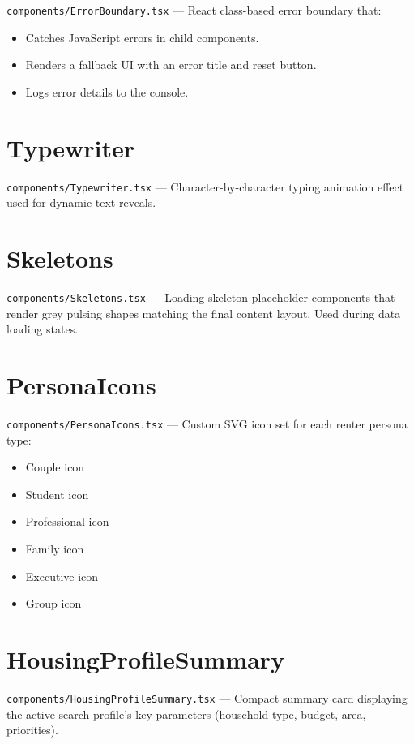\documentclass[12pt, a4paper, oneside]{report}
\newcommand{\filepath}[1]{\texttt{\small\color{codeblue}#1}}
\begin{document}
\filepath{components/ErrorBoundary.tsx} --- React class-based error boundary that:
\begin{itemize}[leftmargin=2em]
  \item Catches JavaScript errors in child components.
  \item Renders a fallback UI with an error title and reset button.
  \item Logs error details to the console.
\end{itemize}

\section{Typewriter}

\filepath{components/Typewriter.tsx} --- Character-by-character typing animation effect used for dynamic text reveals.

\section{Skeletons}

\filepath{components/Skeletons.tsx} --- Loading skeleton placeholder components that render grey pulsing shapes matching the final content layout. Used during data loading states.

\section{PersonaIcons}

\filepath{components/PersonaIcons.tsx} --- Custom SVG icon set for each renter persona type:
\begin{itemize}[leftmargin=2em]
  \item Couple icon
  \item Student icon
  \item Professional icon
  \item Family icon
  \item Executive icon
  \item Group icon
\end{itemize}

\section{HousingProfileSummary}

\filepath{components/HousingProfileSummary.tsx} --- Compact summary card displaying the active search profile's key parameters (household type, budget, area, priorities).
\end{document}
